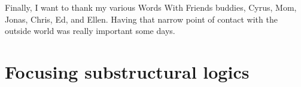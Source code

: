 \documentclass[12pt]{cmuthesis}
\begin{document}
\begin{acknowledgments}
  Finally, I want to thank my various Words With Friends buddies,
  Cyrus, Mom, Jonas, Chris, Ed, and Ellen. Having that narrow point of
  contact with the outside world was really important some days.

\end{acknowledgments}



\tableofcontents
\listoffigures %

\mainmatter


%
%
%
%
%




\part{Focusing substructural logics}
\end{document}
